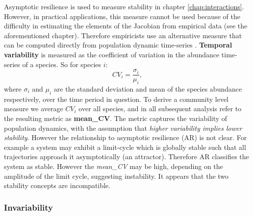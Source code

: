 Asymptotic resilience is used to measure stability in chapter \ref{chap:interactions}. However, in practical applications, this measure cannot be used because of the difficulty in estimating the elements of the Jacobian from empirical data (see the aforementioned chapter). Therefore empiricists use an alternative measure that can be computed directly from population dynamic time-series \cite{campbell2011experimental, donohue2013dimensionality}. \textbf{Temporal variability} is measured as the coefficient of variation in the abundance time-series of a species. So for species $i$: 
\begin{equation}
CV_i = \frac{\sigma_i}{\mu_i},
\label{eq:cov}
\end{equation}
%
where $\sigma_i$ and $\mu_i$ are the standard deviation and mean of the species abundance respectively, over the time period in question. To derive a community level measure we average $CV_i$ over all species, and in all subsequent analysis refer to the resulting metric as \textbf{mean\_CV}. The metric captures the variability of population dynamics, with the assumption that \emph{higher variability implies lower stability}. However the relationship to asymptotic resilience (AR) is not clear. For example a system may exhibit a limit-cycle which is globally stable such that all trajectories approach it asymptotically (an attractor). Therefore AR classifies the system as stable. However the \emph{mean\_CV} may be high, depending on the amplitude of the limit cycle, suggesting instability. It appears that the two stability concepts are incompatible.


\subsubsection{Invariability}
\label{sec:def_invariability}


